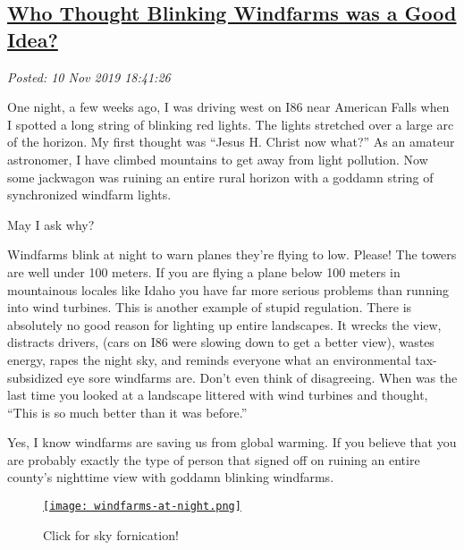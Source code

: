 %

\subsection*{\href{http://analyzethedatanotthedrivel.org/2019/11/10/who-thought-blinking-windfarms-was-a-good-idea/}{Who Thought Blinking Windfarms was a Good Idea?}}


\noindent\emph{Posted: 10 Nov 2019 18:41:26}
\vspace{6pt}

One night, a few weeks ago, I was driving west on I86 near American
Falls when I spotted a long string of blinking red lights. The
lights stretched over a large arc of the horizon. My first thought was
``Jesus H. Christ now what?'' As an amateur astronomer, I have climbed
mountains to get away from light pollution. Now some jackwagon was
ruining an entire rural horizon with a goddamn string of synchronized
windfarm lights.

May I ask why?

Windfarms blink at night to warn planes they're flying to low. Please!
The towers are well under 100 meters. If you are flying a plane below
100 meters in mountainous locales like Idaho you have far more serious
problems than running into wind turbines. This is another example of
stupid regulation. There is absolutely no good reason for lighting up
entire landscapes. It wrecks the view, distracts drivers, (cars on I86
were slowing down to get a better view), wastes energy, rapes the night
sky, and reminds everyone what an environmental tax-subsidized eye sore
windfarms are. Don't even think of disagreeing. When was the last time
you looked at a landscape littered with wind turbines and thought,
``This is so much better than it was before.''

Yes, I know windfarms are saving us from global warming. If you believe
that you are probably exactly the type of person that signed off on
ruining an entire county's nighttime view with goddamn blinking
windfarms.

\captionsetup[figure]{labelformat=empty}
\begin{figure}[htbp]
\centering
\href{https://www.youtube.com/watch?v=JDztGwEqiwQ}{\texttt{[image: windfarms-at-night.png]}}
\caption{Click for sky fornication!}
\label{fig:5643x0}
\end{figure}



%
 